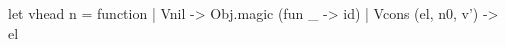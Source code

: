 let vhead n = function
  | Vnil -> 
      Obj.magic (fun _ -> id)
  | Vcons (el, n0, v') -> 
      el